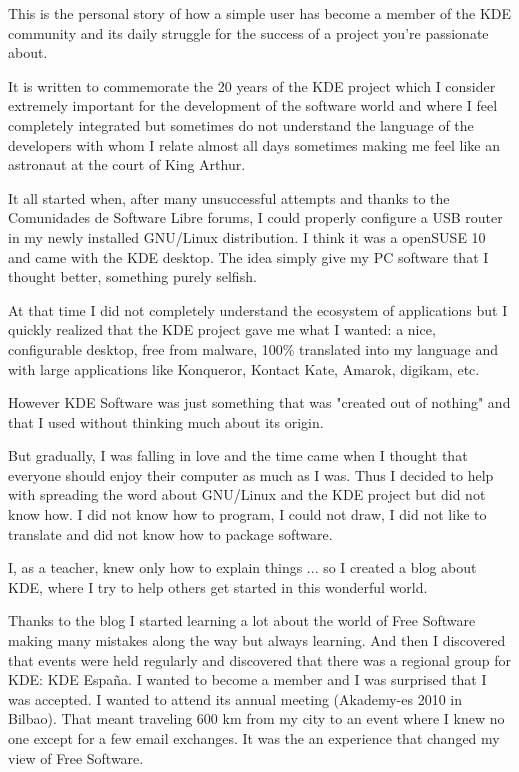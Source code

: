 

\noindent{}This is the personal story of how a simple user has become a member of the KDE community and its daily struggle for the success of a project you're passionate about.

It is written to commemorate the 20 years of the KDE project which I consider extremely important for the development of the software world and where I feel completely integrated but sometimes do not understand the language of the developers with whom I relate almost all days sometimes making me feel like an astronaut at the court of King Arthur.

It all started when, after many unsuccessful attempts and thanks to the Comunidades de Software Libre forums, I could properly configure a USB router in my newly installed GNU/Linux distribution. I think it was a openSUSE 10 and came with the KDE desktop. The idea simply give my PC software that I thought better, something purely selfish.

At that time I did not completely understand the ecosystem of applications but I quickly realized that the KDE project gave me what I wanted: a nice, configurable desktop, free from malware, 100\% translated into my language and with large applications like Konqueror, Kontact Kate, Amarok, digikam, etc.

However KDE Software was just something that was "created out of nothing" and that I used without thinking much about its origin.

But gradually, I was falling in love and the time came when I thought that everyone should enjoy their computer as much as I was.
Thus I decided to help with spreading the word about GNU/Linux and the KDE project but did not know how. I did not know how to program, I could not draw, I did not like to translate and did not know how to package software.

I, as a teacher, knew only how to explain things ... so I created a blog about KDE, where I try to help others get started in this wonderful world.

Thanks to the blog I started learning a lot about the world of Free Software making many mistakes along the way but always learning.
And then I discovered that events were held regularly and discovered that there was a regional group for KDE: KDE Espa\~na. I wanted to become a member and I was surprised that I was accepted. I wanted to attend its annual meeting (Akademy-es 2010 in Bilbao). That meant traveling 600 km from my city to an event where I knew no one except for a few email exchanges. It was the an experience that changed my view of Free Software.

